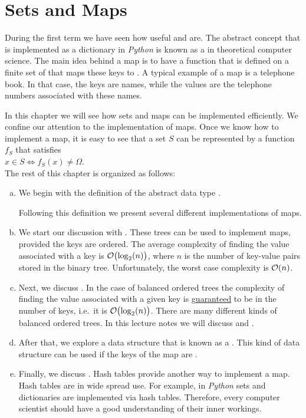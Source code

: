 \chapter{Sets and Maps}
During the first term we have seen how useful  and  are.  The abstract concept
that is implemented as a dictionary in \textsl{Python} is known as a  in theoretical computer science.
The main idea behind a map is to have a function that is defined on a finite set of  that
maps these keys to .  A typical example of a map is a telephone book.  In that case, the keys
are names, while the values are the telephone numbers associated with these names.

In this chapter we will see how sets and maps can be implemented efficiently.  We confine our attention to the
implementation of maps.  Once we know how to implement a map, it is easy to see that a set $S$ can be
represented by a function $f_S$ that satisfies 
\\[0.2cm]
\hspace*{1.3cm}
$x \in S \Leftrightarrow f_S(x) \not= \Omega$.
\\[0.2cm]
The rest of this chapter is organized as follows:
\begin{enumerate}[(a)]
\item We begin with the definition of the abstract data type . 
    
      Following this definition we present several different implementations of maps. 
\item We start our discussion with .  These trees can be used to implement maps,
      provided the keys are ordered.  The average complexity of finding the value associated with a key
      is $\mathcal{O}\bigl(\log_2(n)\bigr)$, where $n$ is the number of key-value pairs stored in the binary tree.
      Unfortunately, the worst case complexity  is $\mathcal{O}(n)$.
\item Next, we discuss .  In the case of balanced ordered trees the
      complexity of finding the value associated with a given key is g\underline{uaranteed} to be
       in the number of keys, i.e.~it is $\mathcal{O}\bigl(\log_2(n)\bigr)$.
      There are many different kinds of balanced ordered trees.  In this lecture notes we will discuss
       and . 
\item After that, we explore a data structure that is known as a .  This kind of data structure can
      be used if the keys of the map are . 
\item Finally, we discuss .  Hash tables provide another way to implement a map.
      Hash tables are in wide spread use.  For example, in \textsl{Python} sets and dictionaries are
      implemented via hash tables.  Therefore, every computer scientist should have a good understanding of
      their inner workings. 
\end{enumerate}

